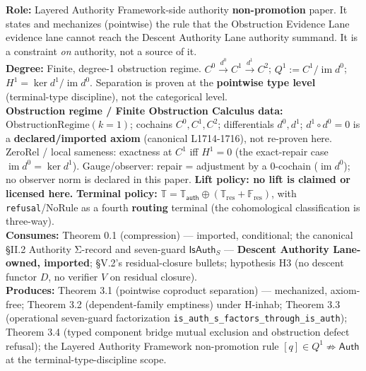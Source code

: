 \documentclass[
  10pt,
]{article}
\DeclareRobustCommand{\texttt}[1]{{\paperSymbolFont\nolinkurl{#1}}}
\begin{document}
\textbf{Role:} Layered Authority Framework-side authority \textbf{non-promotion} paper. It states and mechanizes (pointwise) the rule that the Obstruction Evidence Lane evidence lane cannot reach the Descent Authority Lane authority summand. It is a constraint \emph{on} authority, not a source of it.\\
\textbf{Degree:} Finite, degree-1 obstruction regime. \protect\hypertarget{math-E0093-0151}{}{\(C^0 \xrightarrow{d^0} C^1 \xrightarrow{d^1} C^2\)}; \protect\hypertarget{math-E0094-0152}{}{\(Q^1 := C^1/\operatorname{im} d^0\)}; \protect\hypertarget{math-E0095-0153}{}{\(H^1 = \ker d^1/\operatorname{im} d^0\)}. Separation is proven at the \textbf{pointwise type level} (terminal-type discipline), not the categorical level.\\
\textbf{Obstruction regime / Finite Obstruction Calculus data:} \protect\hypertarget{math-E0096-0154}{}{\(\mathrm{ObstructionRegime}(k{=}1)\)}; cochains \protect\hypertarget{math-E0097-0155}{}{\(C^0, C^1, C^2\)}; differentials \protect\hypertarget{math-E0098-0156}{}{\(d^0, d^1\)}; \protect\hypertarget{math-E0099-0157}{}{\(d^1 \circ d^0 = 0\)} is a \textbf{declared/imported axiom} (canonical L1714-1716), not re-proven here. ZeroRel / local sameness: exactness at \protect\hypertarget{math-E0012-0158}{}{\(C^1\)} iff \protect\hypertarget{math-E0100-0159}{}{\(H^1 = 0\)} (the exact-repair case \protect\hypertarget{math-E0101-0160}{}{\(\operatorname{im} d^0 = \ker d^1\)}). Gauge/observer: repair = adjustment by a 0-cochain (\protect\hypertarget{math-E0102-0161}{}{\(\operatorname{im} d^0\)}); no observer norm is declared in this paper. \textbf{Lift policy: no lift is claimed or licensed here.} \textbf{Terminal policy:} \protect\hypertarget{math-E0040-0162}{}{\(\mathbb{T} = \mathbb{T}_{\mathsf{auth}} \oplus (\mathbb{T}_{\mathrm{res}} + \mathbb{F}_{\mathrm{res}})\)}, with \texttt{refusal}/NoRule as a fourth \textbf{routing} terminal (the cohomological classification is three-way).\\
\textbf{Consumes:} Theorem 0.1 (compression) --- imported, conditional; the canonical §II.2 Authority Σ-record and seven-guard \protect\hypertarget{math-E0033-0163}{}{\(\mathsf{IsAuth}_S\)} --- \textbf{Descent Authority Lane-owned, imported}; §V.2's residual-closure bullets; hypothesis H3 (no descent functor \protect\hypertarget{math-E0060-0164}{}{\(D\)}, no verifier \protect\hypertarget{math-E0061-0165}{}{\(V\)} on residual closure).\\
\textbf{Produces:} Theorem 3.1 (pointwise coproduct separation) --- mechanized, axiom-free; Theorem 3.2 (dependent-family emptiness) under H-inhab; Theorem 3.3 (operational seven-guard factorization \texttt{is\_auth\_s\_factors\_through\_is\_auth}); Theorem 3.4 (typed component bridge mutual exclusion and obstruction defect refusal); the Layered Authority Framework non-promotion rule \protect\hypertarget{math-E0009-0166}{}{\([q] \in Q^1 \not\Rightarrow \mathsf{Auth}\)} at the terminal-type-discipline scope.\\
\end{document}
